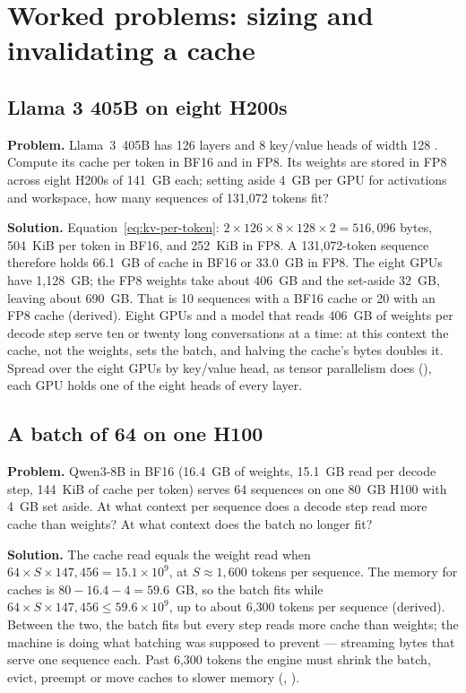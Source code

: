 \section{Worked problems: sizing and invalidating a cache}

\subsection{Llama 3 405B on eight H200s}
\textbf{Problem.} Llama~3~405B has 126 layers and 8 key/value heads of width
128 \cite{llama2024herd}. Compute its cache per token in BF16 and in FP8. Its
weights are stored in FP8 across eight H200s of 141~GB each; setting aside 4~GB
per GPU for activations and workspace, how many sequences of 131,072 tokens
fit?

\textbf{Solution.} Equation~\eqref{eq:kv-per-token}: $2 \times 126 \times 8
\times 128 \times 2 = 516{,}096$ bytes, 504~KiB per token in BF16, and 252~KiB
in FP8. A 131,072-token sequence therefore holds 66.1~GB of cache in BF16 or
33.0~GB in FP8. The eight GPUs have 1,128~GB; the FP8 weights take about
406~GB and the set-aside 32~GB, leaving about 690~GB. That is 10 sequences with
a BF16 cache or 20 with an FP8 cache (derived). Eight GPUs and a model that
reads 406~GB of weights per decode step serve ten or twenty long conversations
at a time: at this context the cache, not the weights, sets the batch, and
halving the cache's bytes doubles it. Spread over the eight GPUs by key/value
head, as tensor parallelism does (), each GPU holds
one of the eight heads of every layer.

\subsection{A batch of 64 on one H100}
\textbf{Problem.} Qwen3-8B in BF16 (16.4~GB of weights, 15.1~GB read per decode
step, 144~KiB of cache per token) serves 64 sequences on one 80~GB H100 with
4~GB set aside. At what context per sequence does a decode step read more cache
than weights? At what context does the batch no longer fit?

\textbf{Solution.} The cache read equals the weight read when
$64 \times S \times 147{,}456 = 15.1 \times 10^{9}$, at $S \approx 1{,}600$ tokens
per sequence. The memory for caches is $80 - 16.4 - 4 = 59.6$~GB, so the batch
fits while $64 \times S \times 147{,}456 \le 59.6 \times 10^{9}$, up to about
6,300 tokens per sequence (derived). Between the two, the batch fits but every
step reads more cache than weights; the machine is doing what batching was
supposed to prevent --- streaming bytes that serve one sequence each. Past
6,300 tokens the engine must shrink the batch, evict, preempt or move caches to
slower memory (, ).

